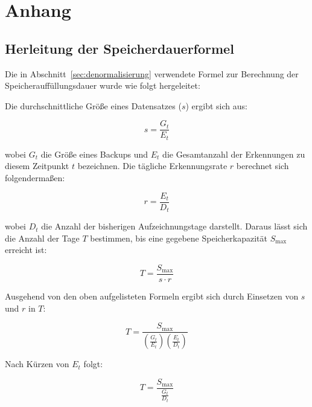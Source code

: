 %
%
\section{Anhang}
\label{sec:anhang}

\subsection{Herleitung der Speicherdauerformel}

Die in Abschnitt~\ref{sec:denormalisierung} verwendete Formel zur Berechnung der Speicherauffüllungsdauer wurde wie folgt hergeleitet:

Die durchschnittliche Größe eines Datensatzes ($s$) ergibt sich aus:

\begin{equation}
    s = \frac{G_t}{E_t}
\end{equation}

wobei $G_t$ die Größe eines Backups und $E_t$ die Gesamtanzahl der Erkennungen zu diesem Zeitpunkt $t$ bezeichnen.
Die tägliche Erkennungsrate $r$ berechnet sich folgendermaßen:

\begin{equation}
    r = \frac{E_t}{D_t}
\end{equation}

wobei $D_t$ die Anzahl der bisherigen Aufzeichnungstage darstellt.
Daraus lässt sich die Anzahl der Tage $T$ bestimmen, bis eine gegebene Speicherkapazität $S_{\max}$ erreicht ist:

\begin{equation}
    T = \frac{S_{\max}}{s \cdot r}
\end{equation}

Ausgehend von den oben aufgelisteten Formeln ergibt sich durch Einsetzen von $s$ und $r$ in $T$:

\begin{equation}
    T = \frac{S_{\max}}{\left(\frac{G_t}{E_t}\right)\left(\frac{E_t}{D_t}\right)}
\end{equation}

Nach Kürzen von $E_t$ folgt:

\begin{equation}
    T = \frac{S_{\max}}{\frac{G_t}{D_t}}
\end{equation}

